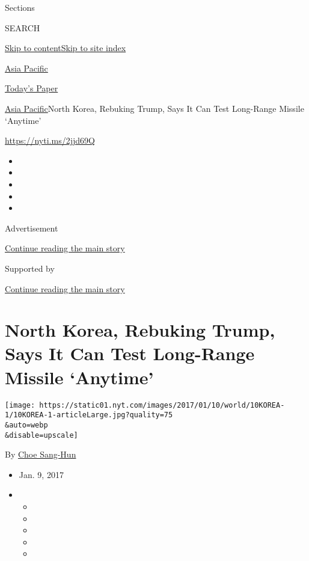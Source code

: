Sections

SEARCH

\protect\hyperlink{site-content}{Skip to
content}\protect\hyperlink{site-index}{Skip to site index}

\href{https://www.nytimes.com/section/world/asia}{Asia Pacific}

\href{https://myaccount.nytimes.com/auth/login?response_type=cookie\&client_id=vi}{}

\href{https://www.nytimes.com/section/todayspaper}{Today's Paper}

\href{/section/world/asia}{Asia Pacific}\textbar{}North Korea, Rebuking
Trump, Says It Can Test Long-Range Missile `Anytime'

\url{https://nyti.ms/2jjd69Q}

\begin{itemize}
\item
\item
\item
\item
\item
\end{itemize}

Advertisement

\protect\hyperlink{after-top}{Continue reading the main story}

Supported by

\protect\hyperlink{after-sponsor}{Continue reading the main story}

\hypertarget{north-korea-rebuking-trump-says-it-can-test-long-range-missile-anytime}{%
\section{North Korea, Rebuking Trump, Says It Can Test Long-Range
Missile
`Anytime'}\label{north-korea-rebuking-trump-says-it-can-test-long-range-missile-anytime}}

\texttt{[image: https://static01.nyt.com/images/2017/01/10/world/10KOREA-1/10KOREA-1-articleLarge.jpg?quality=75\\\&auto=webp\\\&disable=upscale]}

By \href{http://www.nytimes.com/by/choe-sang-hun}{Choe Sang-Hun}

\begin{itemize}
\item
  Jan. 9, 2017
\item
  \begin{itemize}
  \item
  \item
  \item
  \item
  \item
  \end{itemize}
\end{itemize}


